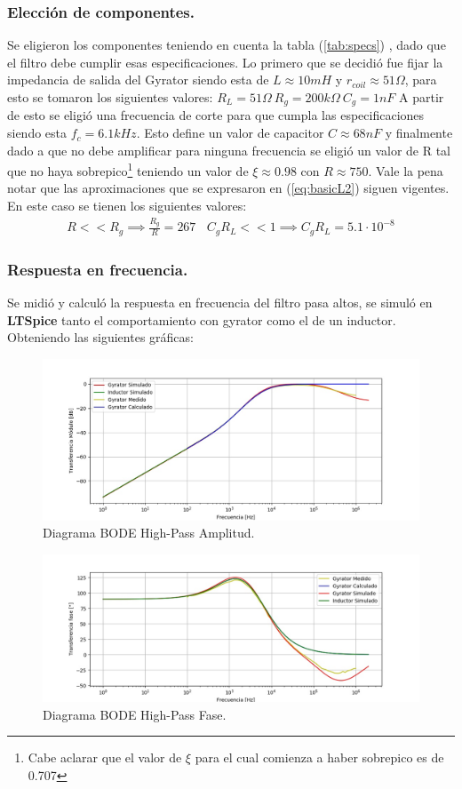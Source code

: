 \documentclass[a4paper]{article}
\begin{document}
\subsubsection{Elección de componentes.}
Se eligieron los componentes teniendo en cuenta la tabla (\ref{tab:specs}) , dado que el filtro debe cumplir esas especificaciones.
Lo primero que se decidió fue fijar la impedancia de salida del Gyrator siendo esta de $L \approx 10mH $ y $r_{coil} \approx 51\Omega $, para esto se tomaron los siguientes valores: $R_L = 51\Omega \ R_g = 200k\Omega \ C_g = 1nF$
A partir de esto se eligió una frecuencia de corte para que cumpla las especificaciones siendo esta $f_c =6.1kHz $. Esto define un valor de capacitor $C \approx 68nF$ y finalmente dado a que no debe amplificar para ninguna frecuencia se eligió un valor de R tal que no haya sobrepico\footnote{Cabe aclarar que el valor de $\xi$ para el cual comienza a haber sobrepico es de 0.707} teniendo un valor de $\xi \approx 0.98 $ con $R \approx 750 $.
	Vale la pena notar que las aproximaciones que se expresaron en (\ref{eq:basicL2}) siguen vigentes. En este caso se tienen los siguientes valores:
\begin{align}  R<<R_g \implies  \frac{R_g}{R}=  267 \ \ \ \ C_gR_L << 1 \implies C_gR_L=5.1 \cdot 10^{-8} \end{align}

\subsubsection{Respuesta en frecuencia.}
Se midió y calculó la respuesta en frecuencia del filtro pasa altos, se simuló en \textbf{LTSpice}  tanto el comportamiento con gyrator como el de un inductor. Obteniendo las siguientes gráficas:
\begin{figure}[H]	
	\centering
	\includegraphics[width=\textwidth]{ImagenesEj2/bodehp.jpg}
	\caption{Diagrama BODE High-Pass Amplitud.}
	\label{fig:bodehp}
\end{figure}
\begin{figure}[H]	
	\centering
	\includegraphics[width=\textwidth]{ImagenesEj2/bodehpp.jpg}
	\caption{Diagrama BODE High-Pass Fase.}
	\label{fig:bodehpp}
\end{figure}
\end{document}

